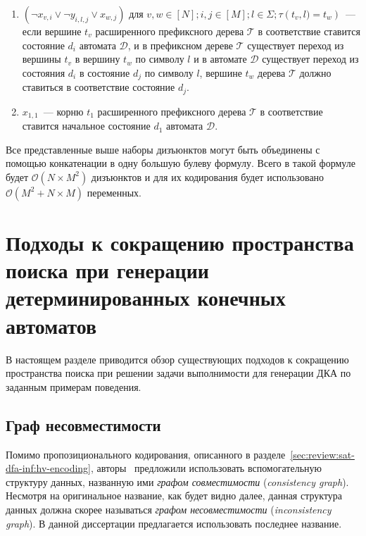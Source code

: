 \begin{enumerate}
  \item $\left(\neg x_{v,i} \vee \neg y_{i,l,j} \vee x_{w,j}\right)$ для $v,w \in \left[N\right]; i,j \in \left[M\right];l \in \Sigma; \tau\left(t_{v},l) = t_{w}\right)$~{---} если вершине $t_{v}$ расширенного префиксного дерева $\mathcal{T} $ в соответствие ставится состояние $d_{i}$ автомата $\mathcal{D}$, и в префиксном дереве $\mathcal{T}$ существует переход из вершины $t_{v}$ в вершину $t_{w}$ по символу $l$ и в автомате $\mathcal{D}$ существует переход из состояния $d_{i}$ в состояние $d_{j}$ по символу $l$, вершине $t_{w}$ дерева $\mathcal{T}$ должно ставиться в соответствие состояние $d_{j}$.
  \item $x_{1,1}$~{---} корню $t_{1}$ расширенного префиксного дерева $\mathcal{T} $ в соответствие ставится начальное состояние $d_{1}$ автомата $\mathcal{D}$.
\end{enumerate}

Все представленные выше наборы дизъюнктов могут быть объединены с помощью конкатенации в одну большую булеву формулу. Всего в такой формуле будет $\mathcal{O}(N \times M^{2})$ дизъюнктов и для их кодирования будет использовано $\mathcal{O}(M^2 + N \times M)$ переменных.


\section{Подходы к сокращению пространства поиска при генерации детерминированных конечных автоматов}
\label{sec:review:sym-breaking}

В настоящем разделе приводится обзор существующих подходов к сокращению пространства поиска при решении задачи выполнимости для генерации ДКА по заданным примерам поведения. 


\subsection{Граф несовместимости}
\label{sec:review:sym-breaking:ig}

Помимо пропозиционального кодирования, описанного в разделе~\ref{sec:review:sat-dfa-inf:hv-encoding}, авторы~\cite{heule-icgi10} предложили использовать вспомогательную структуру данных, названную ими \emph{графом совместимости} (\emph{consistency graph}).
Несмотря на оригинальное название, как будет видно далее, данная структура данных должна скорее называться \emph{графом несовместимости} (\emph{inconsistency graph}).
В данной диссертации предлагается использовать последнее название.

